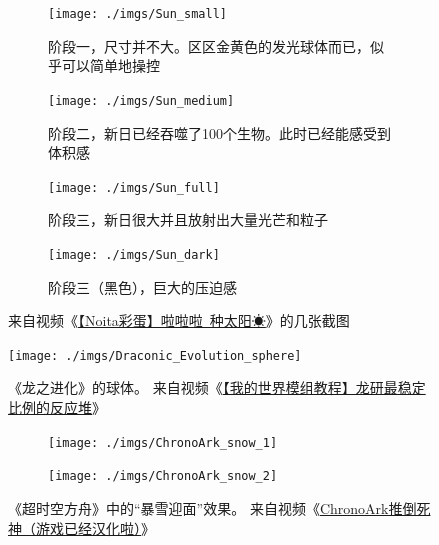 \documentclass[11pt]{article}
\begin{document}
    \begin{figure}[ht]
        \begin{subfigure}{18em}
            \centering
            \texttt{[image: ./imgs/Sun\_small]}
            \caption{阶段一，尺寸并不大。区区金黄色的发光球体而已，似乎可以简单地操控}
        \end{subfigure}
        \begin{subfigure}{18em}
            \centering
            \texttt{[image: ./imgs/Sun\_medium]}
            \caption{阶段二，新日已经吞噬了100个生物。此时已经能感受到体积感}
        \end{subfigure}
        \begin{subfigure}{18em}
            \centering
            \texttt{[image: ./imgs/Sun\_full]}
            \caption{阶段三，新日很大并且放射出大量光芒和粒子}
        \end{subfigure}
        \begin{subfigure}{18em}
            \centering
            \texttt{[image: ./imgs/Sun\_dark]}
            \caption{阶段三（黑色），巨大的压迫感}
        \end{subfigure}
        \caption{来自视频《\href{https://www.bilibili.com/video/BV1CZ4y1w7AL}{【Noita彩蛋】啦啦啦~种太阳☀}》的几张截图}
        \label{fig:sun-screenshots}
    \end{figure}

    \begin{figure}[ht]
        \centering
        \texttt{[image: ./imgs/Draconic\_Evolution\_sphere]}
        \caption{《龙之进化》的球体。
        来自视频《\href{https://www.bilibili.com/video/BV11541187n8}{【我的世界模组教程】龙研最稳定比例的反应堆}》}
        \label{fig:sphere-de}
    \end{figure}

    \begin{figure}[ht]
        \centering
        \begin{subfigure}{\textwidth}
            \centering
            \texttt{[image: ./imgs/ChronoArk\_snow\_1]}
            \caption{}
        \end{subfigure}
        \begin{subfigure}{\textwidth}
            \centering
            \texttt{[image: ./imgs/ChronoArk\_snow\_2]}
            \caption{}
        \end{subfigure}
        \caption{《超时空方舟》中的“暴雪迎面”效果。
        来自视频《\href{https://www.bilibili.com/video/BV1K5411r7cd}{ChronoArk推倒死神（游戏已经汉化啦）}》}
        \label{fig:chronoark-snow}
    \end{figure}
\end{document}
